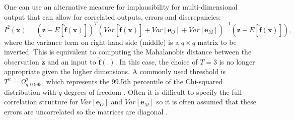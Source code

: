 \documentclass{article}
\newcommand{\numOutputs}{q}
\newcommand{\emulator}{\hat{f}}
\newcommand{\inputVec}{\mathbf{x}}
\newcommand{\obsqD}{\mathbf{z}}
\newcommand{\obsErrorqD}{\mathbf{e}_O}
\newcommand{\modelDiscqD}{\mathbf{e}_M}
\newcommand{\impl}{I}
\newcommand{\NROYspace}{\Omega}
\newcommand{\thresh}{T}
\begin{document}
One can use an alternative measure for implausibility for multi-dimensional output that can allow for correlated outputs, errors and discrepancies:
\begin{equation}
    \label{eqn:impl}
    \impl^2(\inputVec) = \left(\obsqD - E\left[\mathbf{\emulator}(\inputVec)\right]\right)^T \left(Var\left[\mathbf{\emulator}(\inputVec)\right] + Var[\obsErrorqD] + Var[\modelDiscqD] \right)^{-1} \left(\obsqD - E\left[\mathbf{\emulator}(\inputVec)\right]\right),
\end{equation}
where the variance term on right-hand side (middle) is a $\numOutputs \times \numOutputs$ matrix to be inverted. This is equivalent to computing the Mahalanobis distance between the observation $\obsqD$ and an input to $\mathbf{\emulator}(.)$. In this case, the choice of $\thresh=3$ is no longer appropriate given the higher dimensions. A commonly used threshold is $\thresh^2=\NROYspace_{\numOutputs,0.995}^2$, which represents the 99.5th percentile of the Chi-squared distribution with $\numOutputs$ degrees of freedom \citep{Vernon2010,Andrianakis2015,Salter2019}. Often it is difficult to specify the full correlation structure for $Var[\obsErrorqD]$ and $Var[\modelDiscqD]$ so it is often assumed that these errors are uncorrelated so the matrices are diagonal \citep{Andrianakis2015}.
\end{document}
